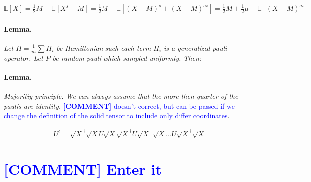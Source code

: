 \documentclass{article}
\newcommand{\commentt}[1]{\textcolor{blue}{ \textbf{[COMMENT]} #1}}
\newcommand{\ctt}[1]{\commentt{#1}}
\begin{document}
\begin{multicols*}{2}
\( \mathbb{E}[X] = \frac{1}{2}M + \mathbb{E}[X^{s} - M] = \frac{1}{2}M + \mathbb{E}[(X-M)^{s} + (X-M)^{as}] = \frac{1}{2}M + \frac{1}{2}\mu + \mathbb{E}[(X-M)^{as}] \) 

\paragraph{Lemma.} \textit{Let \( H = \frac{1}{m}\sum{H_{i}}\) be Hamiltonian such each term \(H_{i}\) is a generalized pauli operator. Let \(P\) be random pauli which sampled uniformly. Then:   }


\paragraph{Lemma.} \textit{Majoritiy principle. We can always assume that the more then quarter of the paulis are identity. } \ctt{ doesn't correct, but can be passed if we change the definition of the solid tensor to include only differ coordinates}.

\begin{equation*}
    \begin{split}
        U^{t} = \sqrt{X}^\dagger\sqrt{X}U\sqrt{X}\sqrt{X}^\dagger U \sqrt{X}^\dagger\sqrt{X} ... U \sqrt{X}^\dagger\sqrt{X}
    \end{split}
\end{equation*}

\section{\ctt{Enter it}}


\end{multicols*}
\end{document}
